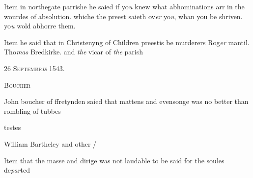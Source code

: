 \documentclass[12pt, a4paper]{book}
\begin{document}
 	
		\ifthenelse{\isodd{\thepage}}
		{\reversemarginpar}
		{\normalmarginpar}
		Item in northegate parrishe he saied if yo\textit{u} knew
 what abhominations arr in the wourdes of
 absolution. whiche the preest saieth ov\textit{er} yo\textit{u}, whan
 you be shriven. yo\textit{u} wold abhorre them.
 

	
				\marginpar[\vspace{0.5cm}{\textcolor{Gray}{offensive}}]{}
			
	
		\ifthenelse{\isodd{\thepage}}
		{\reversemarginpar}
		{\normalmarginpar}
		Item he said that in Christenyng of Children
		preestis be murderers Rog\textit{er} mantil. Tho\textit{mas} Bredkirke.
		and \textit{the} vicar of \textit{the} parish
 

            
            
               
				\begin{center} \begin{large} {\scshape 
                  26 Septembr\textit{is} 1543.} \end{large} \end{center}
			
               
               	
				\begin{center}  {\scshape Boucher}  \end{center}
			
               	
               		
				\marginpar[\vspace{0.5cm}{\textcolor{Gray}{Offensive n}}]{}
			
               		
		\ifthenelse{\isodd{\thepage}}
		{\reversemarginpar}
		{\normalmarginpar}
		John boucher of ffretynden saied that mattens and
  evensonge was no better than rombling of tubbes
               	
 
 	
		\ifthenelse{\isodd{\thepage}}
		{\reversemarginpar}
		{\normalmarginpar}
		testes
 	
		\ifthenelse{\isodd{\thepage}}
		{\reversemarginpar}
		{\normalmarginpar}
		William Bartheley and other /
 	
 

	
			
	
		\ifthenelse{\isodd{\thepage}}
		{\reversemarginpar}
		{\normalmarginpar}
		Item that the masse and dirige was not laudable
 to be said for the soules de\textit{par}ted
\end{document}
